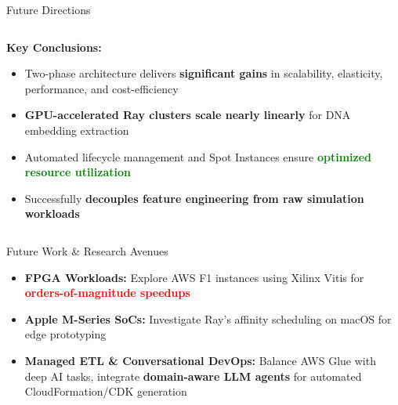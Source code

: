 \documentclass[aspectratio=169]{beamer}
\begin{document}
\begin{frame}{Future Directions}
    \begin{columns}
        \begin{column}{0.6\textwidth}
            \textbf{Key Conclusions:}
            \begin{itemize}
                \item Two-phase architecture delivers \textbf{significant gains} in scalability, elasticity, performance, and cost-efficiency
                \item \textcolor{rayblue}{\textbf{GPU-accelerated Ray clusters scale nearly linearly}} for DNA embedding extraction
                \item Automated lifecycle management and Spot Instances ensure \textcolor{green}{\textbf{optimized resource utilization}}
                \item Successfully \textbf{decouples feature engineering from raw simulation workloads}
            \end{itemize}
        \end{column}
        \begin{column}{0.4\textwidth}
        \end{column}
    \end{columns}
    
    \vspace{0.3cm}
    \begin{block}{Future Work \& Research Avenues}
        \begin{itemize}
            \item \textbf{FPGA Workloads:} Explore AWS F1 instances using Xilinx Vitis for \textcolor{red}{\textbf{orders-of-magnitude speedups}}
            \item \textbf{Apple M-Series SoCs:} Investigate Ray's affinity scheduling on macOS for edge prototyping
            \item \textbf{Managed ETL \& Conversational DevOps:} Balance AWS Glue with deep AI tasks, integrate \textcolor{rayblue}{\textbf{domain-aware LLM agents}} for automated CloudFormation/CDK generation
        \end{itemize}
    \end{block}
\end{frame}
\end{document}
